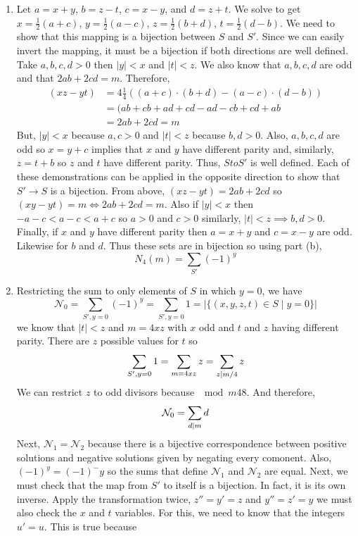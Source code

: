 \documentclass[12pt]{extarticle}
\begin{document}
\begin{enumerate}
\begin{enumerate}
\item Let $a = x + y$, $b = z - t$, $c = x - y$, and $d = z + t$. We solve to get $x = \frac{1}{2}(a + c)$, $y = \frac{1}{2} (a - c)$, $z = \frac{1}{2} (b + d)$, $t = \frac{1}{2} (d - b)$. We need to show that this mapping is a bijection between $S$ and $S'$. Since we can easily invert the mapping, it must be a bijection if both directions are well defined. Take $a,b,c,d > 0$ then $|y| < x$ and $|t| < z$. We also know that $a,b,c,d$ are odd and that $2ab + 2cd = m$. Therefore,
\begin{align*}
(xz - yt) &= 4 \frac{1}{4} \left((a + c) \cdot (b + d) - (a - c) \cdot (d - b) \right) \\
&= (ab + cb + ad + cd - ad - cb + cd + ab \\ 
& = 2ab + 2cd = m
\end{align*}
But, $|y| < x$ because $a, c > 0$ and $|t| < z$ because $b,d > 0$. Also, $a,b,c,d$ are odd so $x = y + c$ implies that $x$ and $y$ have different parity and, similarly, $z = t + b$ so $z$ and $t$ have different parity. Thus, $S to S'$ is well defined. Each of these demonstrations can be applied in the opposite direction to show that $S' \to S$ is a bijection. From above, $(xz - yt) = 2ab + 2cd$ so $(xy - yt) = m \iff 2ab + 2cd = m$. Also if $|y| < x$ then $-a - c < a - c < a + c$ so $a > 0$ and $c > 0$ similarly, $|t| < z \implies b, d > 0$. Finally, if $x$ and $y$ have different parity then $a = x + y$ and $c = x - y$ are odd. Likewise for $b$ and $d$. Thus these sets are in bijection so using part (b),
\[N_4(m) = \sum_{S'} (-1)^y\]
\item Restricting the sum to only elements of $S$ in which $y = 0$, we have
\[\mathcal{N}_0 = \sum_{S', y = 0} (-1)^y =  \sum_{S', y = 0} 1 = \Big| \{(x,y,z,t) \in S \mid y = 0\} \Big| \] 
we know that $|t| < z$ and $m = 4xz$ with $x$ odd and $t$ and $z$ having different parity. There are $z$ possible values for $t$ so 
\[ \sum_{S', y = 0} 1 = \sum_{m = 4xz} z = \sum_{z \mid m/4} z \]
We can restrict $z$ to odd divisors because $\mod{m}{4}{8}$. And therefore,
\[\mathcal{N}_0 = \sum_{d \mid m} d\]
Next, $\mathcal{N}_1 = \mathcal{N}_2$ because there is a bijective correspondence between positive solutions and negative solutions given by negating every comonent. Also, $(-1)^y = (-1)^-y$ so the sums that define $\mathcal{N}_1$ and $\mathcal{N}_2$ are equal. Next, we must check that the map from $S'$ to itself is a bijection. In fact, it is its own inverse. Apply the transformation twice, $z'' = y' = z$ and $y'' = z' = y$ we must also check the $x$ and $t$ variables. For this, we need to know that the integers $u' = u$. This is true because 

\end{enumerate}
\end{enumerate}
\end{document}
